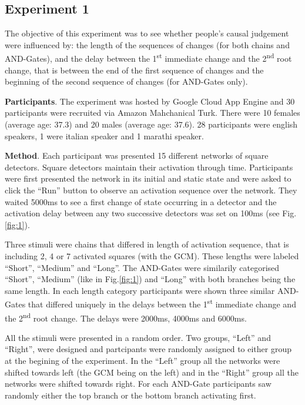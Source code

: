 \documentclass[10pt,letterpaper]{article}
\begin{document}
\subsection{Experiment 1}

The objective of this experiment was to see whether people's causal judgement were influenced by: the length of the sequences of changes (for both chains and AND-Gates), and the delay between the 1\textsuperscript{st} immediate change and the 2\textsuperscript{nd} root change, that is between the end of the first sequence of changes and the beginning of the second sequence of changes (for AND-Gates only).

\textbf{Participants}. The experiment was hosted by Google Cloud App Engine and 30 participants were recruited via Amazon Mahchanical Turk. There were 10 females (average age: 37.3) and 20 males (average age: 37.6). 28 participants were english speakers, 1 were italian speaker and 1 marathi speaker.

\textbf{Method}. Each participant was presented 15 different networks of square detectors. Square detectors maintain their activation through time. Participants were first presented the network in its initial and static state and were asked to click the ``Run'' button to observe an activation sequence over the network. They waited 5000ms to see a first change of state occurring in a detector and the activation delay between any two successive detectors was set on 100ms (see Fig.\ref{fig:1}). 

Three stimuli were chains that differed in length of activation sequence, that is including 2, 4 or 7 activated squares (with the GCM). These lengths were labeled ``Short'', ``Medium'' and ``Long''. The AND-Gates were similarily categorised ``Short'', ``Medium'' (like in Fig.\ref{fig:1}) and ``Long'' with both branches being the same length. In each length category participants were shown three similar AND-Gates that differed uniquely in the delays between the 1\textsuperscript{st} immediate change and the 2\textsuperscript{nd} root change. The delays were 2000ms, 4000ms and 6000ms.

All the stimuli were presented in a random order. Two groups, ``Left'' and ``Right'', were designed and partcipants were randomly assigned to either group at the begining of the experiment. In the ``Left'' group all the networks were shifted towards left (the GCM being on the left) and in the ``Right'' group all the networks were shifted towards right. For each AND-Gate participants saw randomly either the top branch or the bottom branch activating first.
\end{document}
